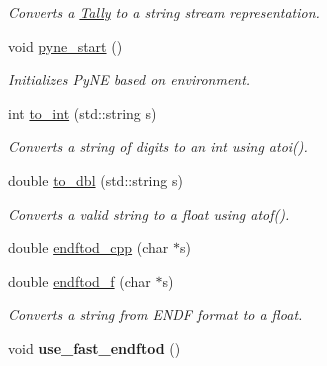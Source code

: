 \begin{DoxyCompactItemize}
\begin{DoxyCompactList}\small\item\em Converts a \hyperlink{classpyne_1_1_tally}{Tally} to a string stream representation. \end{DoxyCompactList}\item 
void \hyperlink{namespacepyne_a3b5ffed8eb26b84ae2a5af20aa205623}{pyne\+\_\+start} ()\hypertarget{namespacepyne_a3b5ffed8eb26b84ae2a5af20aa205623}{}\label{namespacepyne_a3b5ffed8eb26b84ae2a5af20aa205623}

\begin{DoxyCompactList}\small\item\em Initializes Py\+NE based on environment. \end{DoxyCompactList}\item 
int \hyperlink{namespacepyne_ac3037fd5c966b2b515bbbcb0ee56e97a}{to\+\_\+int} (std\+::string s)\hypertarget{namespacepyne_ac3037fd5c966b2b515bbbcb0ee56e97a}{}\label{namespacepyne_ac3037fd5c966b2b515bbbcb0ee56e97a}

\begin{DoxyCompactList}\small\item\em Converts a string of digits to an int using atoi(). \end{DoxyCompactList}\item 
double \hyperlink{namespacepyne_a621b34e474bc505d63aa5c4d7b0ea568}{to\+\_\+dbl} (std\+::string s)\hypertarget{namespacepyne_a621b34e474bc505d63aa5c4d7b0ea568}{}\label{namespacepyne_a621b34e474bc505d63aa5c4d7b0ea568}

\begin{DoxyCompactList}\small\item\em Converts a valid string to a float using atof(). \end{DoxyCompactList}\item 
double \hyperlink{namespacepyne_a45f290823266c99c35b7b84516087de0}{endftod\+\_\+cpp} (char $\ast$s)
\item 
double \hyperlink{namespacepyne_a14e300f1e589b42aaa451bc3cf4c70b8}{endftod\+\_\+f} (char $\ast$s)\hypertarget{namespacepyne_a14e300f1e589b42aaa451bc3cf4c70b8}{}\label{namespacepyne_a14e300f1e589b42aaa451bc3cf4c70b8}

\begin{DoxyCompactList}\small\item\em Converts a string from E\+N\+DF format to a float. \end{DoxyCompactList}\item 
void {\bfseries use\+\_\+fast\+\_\+endftod} ()\hypertarget{namespacepyne_a314ad855be2083a69c8c807b137466ac}{}\label{namespacepyne_a314ad855be2083a69c8c807b137466ac}


\end{DoxyCompactItemize}
